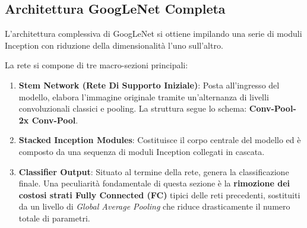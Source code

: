 ﻿\documentclass[11pt, a4paper]{article}
\begin{document}

\subsection{Architettura GoogLeNet Completa}

L'architettura complessiva di GoogLeNet si ottiene impilando una serie di moduli Inception con riduzione della dimensionalità l'uno sull'altro.


La rete si compone di tre macro-sezioni principali:

\begin{enumerate}
    \item \textbf{Stem Network (Rete Di Supporto Iniziale)}: Posta all'ingresso del modello, elabora l'immagine originale tramite un'alternanza di livelli convoluzionali classici e pooling. La struttura segue lo schema: \textbf{Conv-Pool-2x Conv-Pool}.


    \item \textbf{Stacked Inception Modules}: Costituisce il corpo centrale del modello ed è composto da una sequenza di moduli Inception collegati in cascata.


    \item \textbf{Classifier Output}: Situato al termine della rete, genera la classificazione finale. Una peculiarità fondamentale di questa sezione è la \textbf{rimozione dei costosi strati Fully Connected (FC)} tipici delle reti precedenti, sostituiti da un livello di \emph{Global Average Pooling} che riduce drasticamente il numero totale di parametri.

\end{enumerate}
\end{document}
